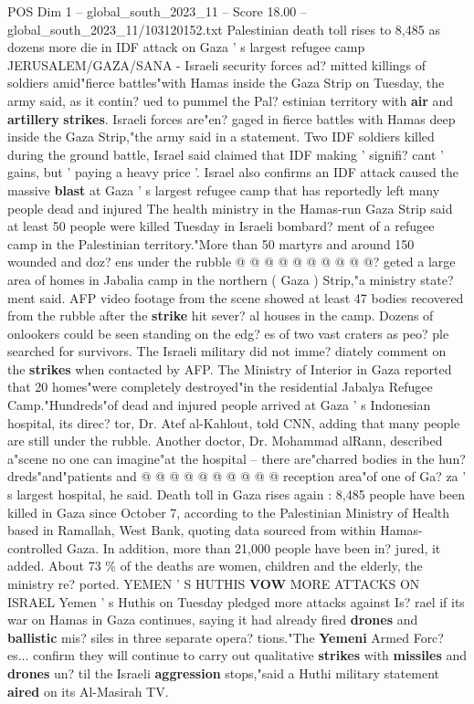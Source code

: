 \begin{textsample}{POS Dim 1 – global\_south\_2023\_11 – Score 18.00 – global\_south\_2023\_11/103120152.txt}  \label{ex:f1_pos_227}
Palestinian death toll rises to 8,485 as dozens more die in IDF attack on Gaza ' s largest refugee camp JERUSALEM/GAZA/SANA - Israeli security forces ad? mitted killings of soldiers amid"fierce battles"with Hamas inside the Gaza Strip on Tuesday, the army said, as it contin? ued to pummel the Pal? estinian territory with \textbf{air} and \textbf{artillery} \textbf{strikes}.
Israeli forces are"en? gaged in fierce battles with Hamas deep inside the Gaza Strip,"the army said in a statement.
Two IDF soldiers killed during the ground battle, Israel said claimed that IDF making ' signifi? cant ' gains, but ' paying a heavy price '.
Israel also confirms an IDF attack caused the massive \textbf{blast} at Gaza ' s largest refugee camp that has reportedly left many people dead and injured The health ministry in the Hamas-run Gaza Strip said at least 50 people were killed Tuesday in Israeli bombard? ment of a refugee camp in the Palestinian territory."More than 50 martyrs and around 150 wounded and doz? ens under the rubble @ @ @ @ @ @ @ @ @ @? geted a large area of homes in Jabalia camp in the northern ( Gaza ) Strip,"a ministry state? ment said.
AFP video footage from the scene showed at least 47 bodies recovered from the rubble after the \textbf{strike} hit sever? al houses in the camp.
Dozens of onlookers could be seen standing on the edg? es of two vast craters as peo? ple searched for survivors.
The Israeli military did not imme? diately comment on the \textbf{strikes} when contacted by AFP.
The Ministry of Interior in Gaza reported that 20 homes"were completely destroyed"in the residential Jabalya Refugee Camp."Hundreds"of dead and injured people arrived at Gaza ' s Indonesian hospital, its direc? tor, Dr.
Atef al-Kahlout, told CNN, adding that many people are still under the rubble.
Another doctor, Dr.
Mohammad alRann, described a"scene no one can imagine"at the hospital -- there are"charred bodies in the hun? dreds"and"patients and @ @ @ @ @ @ @ @ @ @ reception area"of one of Ga? za ' s largest hospital, he said.
Death toll in Gaza rises again : 8,485 people have been killed in Gaza since October 7, according to the Palestinian Ministry of Health based in Ramallah, West Bank, quoting data sourced from within Hamas-controlled Gaza.
In addition, more than 21,000 people have been in? jured, it added.
About 73 \% of the deaths are women, children and the elderly, the ministry re? ported.
YEMEN ' S HUTHIS \textbf{VOW} MORE ATTACKS ON ISRAEL Yemen ' s Huthis on Tuesday pledged more attacks against Is? rael if its war on Hamas in Gaza continues, saying it had already fired \textbf{drones} and \textbf{ballistic} mis? siles in three separate opera? tions."The \textbf{Yemeni} Armed Forc? es... confirm they will continue to carry out qualitative \textbf{strikes} with \textbf{missiles} and \textbf{drones} un? til the Israeli \textbf{aggression} stops,"said a Huthi military statement \textbf{aired} on its Al-Masirah TV.

\end{textsample}
